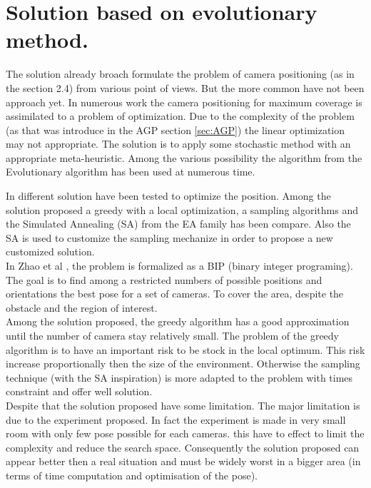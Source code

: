 	
	\section{Solution based on evolutionary  method.} \label{sec:SolutionBasedonEA}
	
	The solution already broach formulate the problem of camera positioning (as in the section 2.4) from various point of views. But the more common have not been approach yet.
In numerous work the camera positioning for maximum coverage is assimilated to a problem of optimization. Due to the complexity of the problem (as that was introduce in the AGP section \ref{sec:AGP}) the linear optimization may not appropriate.  
The solution is to apply some stochastic method with an appropriate meta-heuristic. Among the various possibility the algorithm from the Evolutionary algorithm has been used at numerous time. 

In \cite{151*zhao2013} different solution have been tested to optimize the position. Among the solution proposed a greedy with a local optimization,  a sampling algorithms and the Simulated Annealing (SA) from the EA family has been compare.  Also the SA is used to customize the sampling mechanize in order to propose a new customized solution. \\
In Zhao et al \cite{151*zhao2013}, the problem is formalized as a BIP (binary integer programing). %
  The goal is to find among a restricted numbers of possible positions and orientations the best pose for a set of cameras. To cover the area, despite the obstacle and the region of interest. \\
Among the solution proposed, the greedy algorithm has a good approximation until the number of camera stay relatively small. The problem of the greedy algorithm is to have an important risk to be stock in the local optimum. This risk increase proportionally then the size of the environment. Otherwise the sampling technique (with the SA inspiration) is more adapted to the problem with times constraint and offer well solution.\\
Despite that the solution proposed have some limitation. The major limitation is due to the experiment proposed. In fact the experiment is made in very small room with only few pose possible  for each cameras. this  have to effect to limit the complexity and reduce the search space. Consequently the solution proposed can appear better then a real situation and must be widely worst in a bigger area (in terms of time computation and  optimisation of the pose).\\

